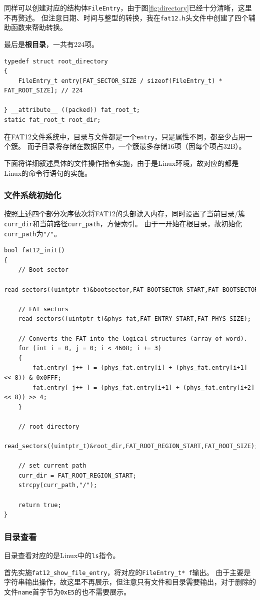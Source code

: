 \documentclass[logo,reportComp]{thesis}
\begin{document}
同样可以创建对应的结构体\verb'FileEntry'，由于图\ref{fig:directory}已经十分清晰，这里不再赘述。
但注意日期、时间与整型的转换，我在\verb'fat12.h'头文件中创建了四个辅助函数来帮助转换。

最后是\textbf{根目录}，一共有224项。
\begin{lstlisting}
typedef struct root_directory
{
	FileEntry_t entry[FAT_SECTOR_SIZE / sizeof(FileEntry_t) * FAT_ROOT_SIZE]; // 224

} __attribute__ ((packed)) fat_root_t;
static fat_root_t root_dir;
\end{lstlisting}

在FAT12文件系统中，目录与文件都是一个\verb'entry'，只是属性不同，都至少占用一个簇。
而子目录将存储在数据区中，一个簇最多存储16项（因每个项占32B）。

下面将详细叙述具体的文件操作指令实施，由于是Linux环境，故对应的都是Linux的命令行语句的实施。
\subsubsection{文件系统初始化}
按照上述四个部分次序依次将FAT12的头部读入内存，同时设置了当前目录/簇\verb'curr_dir'和当前路径\verb'curr_path'，方便索引。
由于一开始在根目录，故初始化\verb'curr_path'为\verb'"/"'。
\begin{lstlisting}
bool fat12_init()
{
	// Boot sector
	read_sectors((uintptr_t)&bootsector,FAT_BOOTSECTOR_START,FAT_BOOTSECTOR_SIZE);

	// FAT sectors
	read_sectors((uintptr_t)&phys_fat,FAT_ENTRY_START,FAT_PHYS_SIZE);

	// Converts the FAT into the logical structures (array of word).
	for (int i = 0, j = 0; i < 4608; i += 3)
	{
		fat.entry[ j++ ] = (phys_fat.entry[i] + (phys_fat.entry[i+1] << 8)) & 0x0FFF;
		fat.entry[ j++ ] = (phys_fat.entry[i+1] + (phys_fat.entry[i+2] << 8)) >> 4;
	}

	// root directory
	read_sectors((uintptr_t)&root_dir,FAT_ROOT_REGION_START,FAT_ROOT_SIZE);

	// set current path
	curr_dir = FAT_ROOT_REGION_START;
	strcpy(curr_path,"/");

	return true;
}
\end{lstlisting}

\subsubsection{目录查看}
目录查看对应的是Linux中的\verb'ls'指令。

首先实施\verb'fat12_show_file_entry'，将对应的\verb'FileEntry_t* f'输出。
由于主要是字符串输出操作，故这里不再展示，但注意只有文件和目录需要输出，对于删除的文件\verb'name'首字节为\verb'0xE5'的也不需要展示。
\end{document}

